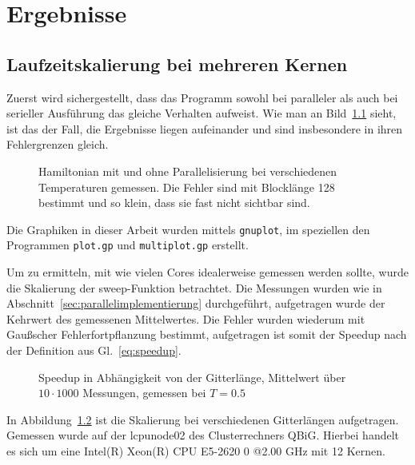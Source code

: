 	\chapter{Ergebnisse}
	\label{chap:ergebnisse}
	
	
	\section{Laufzeitskalierung bei mehreren Kernen}
	\label{sec:ergebnisparallel}
	Zuerst wird sichergestellt, dass das Programm sowohl bei paralleler als auch bei serieller Ausführung das gleiche Verhalten aufweist. Wie man an Bild~\ref{fig:vergleichham} sieht, ist das der Fall, die Ergebnisse liegen aufeinander und sind insbesondere in ihren Fehlergrenzen gleich.
	
	\begin{figure}[htbp]
		
		\caption[Hamiltonian mit und ohne Parallelisierung]{Hamiltonian mit und ohne Parallelisierung bei verschiedenen Temperaturen gemessen. Die Fehler sind mit Blocklänge 128 bestimmt und so klein, dass sie fast nicht sichtbar sind.}
		\label{fig:vergleichham}
	\end{figure}
	
	Die Graphiken in dieser Arbeit wurden mittels \texttt{gnuplot}, im speziellen den Programmen \texttt{plot.gp} und \texttt{multiplot.gp} erstellt.
	
	Um zu ermitteln, mit wie vielen Cores idealerweise gemessen werden sollte, wurde die Skalierung der sweep-Funktion betrachtet. Die Messungen wurden wie in Abschnitt~\ref{sec:parallelimplementierung} durchgeführt, aufgetragen wurde der Kehrwert des gemessenen Mittelwertes. Die Fehler wurden wiederum mit Gaußscher Fehlerfortpflanzung bestimmt, aufgetragen ist somit der Speedup nach der Definition aus Gl.~\ref{eq:speedup}.%
	
	\begin{figure}[htbp]
		
		\caption[Speedup in Abhängigkeit von der Gitterlänge]{Speedup in Abhängigkeit von der Gitterlänge, Mittelwert über $10 \cdot 1000$ Messungen, gemessen bei $T=\num{0,5}$}
		\label{fig:skalierunglaenge}
	\end{figure}
	
	In Abbildung~\ref{fig:skalierunglaenge} ist die Skalierung bei verschiedenen Gitterlängen aufgetragen. Gemessen wurde auf der lcpunode02 des Clusterrechners QBiG. Hierbei handelt es sich um eine Intel(R) Xeon(R) CPU E5-2620 0 @2.00 GHz mit 12 Kernen.%
	
